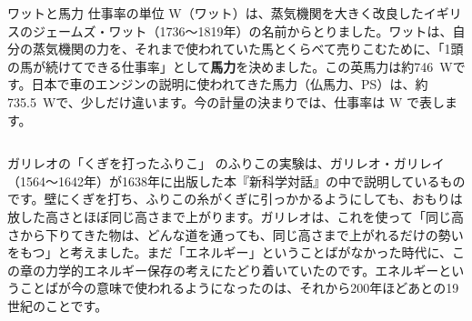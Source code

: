 \begin{column}{ワットと馬力}
仕事率の単位 W（ワット）は、蒸気機関を大きく改良したイギリスのジェームズ・ワット（1736〜1819年）の名前からとりました。ワットは、自分の蒸気機関の力を、それまで使われていた馬とくらべて売りこむために、「1頭の馬が続けてできる仕事率」として\textbf{馬力}を決めました。この英馬力は約\qty{746}{W}です。日本で車のエンジンの説明に使われてきた馬力（仏馬力、PS）は、約\qty{735.5}{W}で、少しだけ違います。今の計量の決まりでは、仕事率は W で表します。
\end{column}

\begin{column}{ガリレオの「くぎを打ったふりこ」}
\bkyattemiyouref のふりこの実験は、ガリレオ・ガリレイ（1564〜1642年）が1638年に出版した本『新科学対話』の中で説明しているものです。壁にくぎを打ち、ふりこの糸がくぎに引っかかるようにしても、おもりは放した高さとほぼ同じ高さまで上がります。ガリレオは、これを使って「同じ高さから下りてきた物は、どんな道を通っても、同じ高さまで上がれるだけの勢いをもつ」と考えました。まだ「エネルギー」ということばがなかった時代に、この章の力学的エネルギー保存の考えにたどり着いていたのです。エネルギーということばが今の意味で使われるようになったのは、それから200年ほどあとの19世紀のことです。
\end{column}


